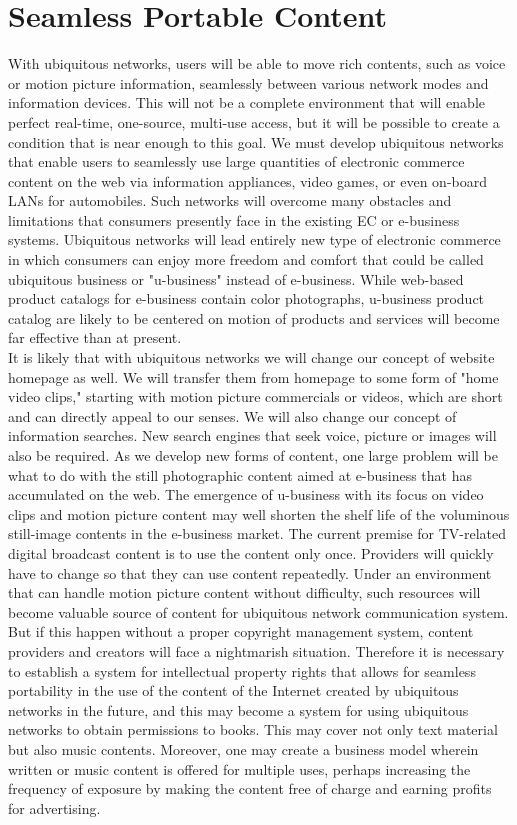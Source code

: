 \documentclass[12pt]{report}
\begin{document}
\section{Seamless Portable Content}
\hspace*{0.5in}With ubiquitous networks, users will be able to move rich contents, such as voice or motion picture information, seamlessly between various network modes and information devices. This will not be a complete environment that will enable perfect real-time, one-source, multi-use access, but it will be possible to create a condition that is near enough to this goal. We must develop ubiquitous networks that enable users to seamlessly use large quantities of electronic commerce content on the web via information appliances, video games, or even on-board LANs for automobiles. Such networks will overcome many obstacles and limitations that consumers presently face in the existing EC or e-business systems. Ubiquitous networks will lead entirely new type of electronic commerce in which consumers can enjoy more freedom and comfort that could be called ubiquitous business or "u-business" instead of e-business. While web-based product catalogs for e-business contain color photographs, u-business product catalog are likely to be centered on motion of products and services will become far effective than at present.
\\\hspace*{0.5in}It is likely that with ubiquitous networks we will change our concept of website homepage as well. We will transfer them from homepage to some form of "home video clips," starting with motion picture commercials or videos, which are short and can directly appeal to our senses. We will also change our concept of information searches. New search engines that seek voice, picture or images will also be required. As we develop new forms of content, one large problem will be what to do with the still photographic content aimed at e-business that has accumulated on the web. The emergence of u-business with its focus on video clips and motion picture content may well shorten the shelf life of the voluminous still-image contents in the e-business market. The current premise for TV-related digital broadcast content is to use the content only once. Providers will quickly have to change so that they can use content repeatedly. Under an environment that can handle motion picture content without difficulty, such resources will become valuable source of content for ubiquitous network communication system. But if this happen without a proper copyright management system, content providers and creators will face a nightmarish situation. Therefore it is necessary to establish a system for intellectual property rights that allows for seamless portability in the use of the content of the Internet created by ubiquitous networks in the future, and this may become a system for using ubiquitous networks to obtain permissions to books. This may cover not only text material but also music contents. Moreover, one may create a business model wherein written or music content is offered for multiple uses, perhaps increasing the frequency of exposure by making the content free of charge and earning profits for advertising.
\end{document}
